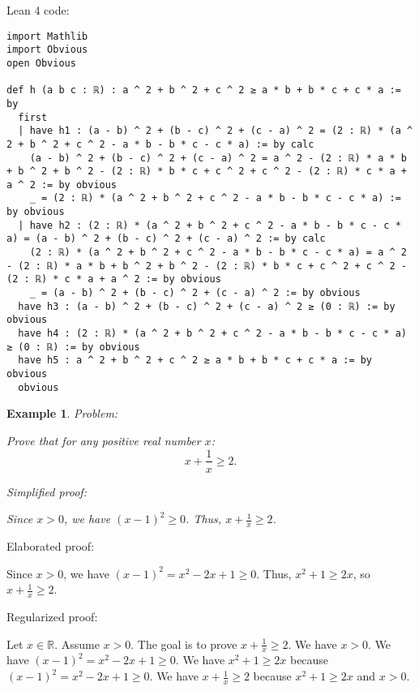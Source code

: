 \documentclass{article}
\newtheorem{example}{Example}
\begin{document}
Lean 4 code:
\begin{tcolorbox}[colback=white!10, width=\linewidth]
\begin{lstlisting}[language=Lean4]
import Mathlib
import Obvious
open Obvious

def h (a b c : ℝ) : a ^ 2 + b ^ 2 + c ^ 2 ≥ a * b + b * c + c * a := by
  first
  | have h1 : (a - b) ^ 2 + (b - c) ^ 2 + (c - a) ^ 2 = (2 : ℝ) * (a ^ 2 + b ^ 2 + c ^ 2 - a * b - b * c - c * a) := by calc
    (a - b) ^ 2 + (b - c) ^ 2 + (c - a) ^ 2 = a ^ 2 - (2 : ℝ) * a * b + b ^ 2 + b ^ 2 - (2 : ℝ) * b * c + c ^ 2 + c ^ 2 - (2 : ℝ) * c * a + a ^ 2 := by obvious
    _ = (2 : ℝ) * (a ^ 2 + b ^ 2 + c ^ 2 - a * b - b * c - c * a) := by obvious
  | have h2 : (2 : ℝ) * (a ^ 2 + b ^ 2 + c ^ 2 - a * b - b * c - c * a) = (a - b) ^ 2 + (b - c) ^ 2 + (c - a) ^ 2 := by calc
    (2 : ℝ) * (a ^ 2 + b ^ 2 + c ^ 2 - a * b - b * c - c * a) = a ^ 2 - (2 : ℝ) * a * b + b ^ 2 + b ^ 2 - (2 : ℝ) * b * c + c ^ 2 + c ^ 2 - (2 : ℝ) * c * a + a ^ 2 := by obvious
    _ = (a - b) ^ 2 + (b - c) ^ 2 + (c - a) ^ 2 := by obvious
  have h3 : (a - b) ^ 2 + (b - c) ^ 2 + (c - a) ^ 2 ≥ (0 : ℝ) := by obvious
  have h4 : (2 : ℝ) * (a ^ 2 + b ^ 2 + c ^ 2 - a * b - b * c - c * a) ≥ (0 : ℝ) := by obvious
  have h5 : a ^ 2 + b ^ 2 + c ^ 2 ≥ a * b + b * c + c * a := by obvious
  obvious

\end{lstlisting}
\end{tcolorbox}


\begin{example}
Problem:
\begin{tcolorbox}[colback=yellow!10, width=\linewidth]
Prove that for any positive real number $x$:
    $$x + \frac{1}{x} \geq 2.$$
\end{tcolorbox}

Simplified proof:
\begin{tcolorbox}[colback=blue!10, width=\linewidth]
Since $x>0$, we have $(x-1)^2 \ge 0$. Thus, $x + \frac{1}{x} \ge 2$.
\end{tcolorbox}
\end{example}

Elaborated proof:
\begin{tcolorbox}[colback=green!10, width=\linewidth]
Since $x>0$, we have $(x-1)^2 = x^2 - 2x + 1 \ge 0$. Thus, $x^2 + 1 \ge 2x$, so $x + \frac{1}{x} \ge 2$.
\end{tcolorbox}

Regularized proof:
\begin{tcolorbox}[colback=red!10, width=\linewidth]
Let $x\in\mathbb{R}$.
Assume $x>0$.
The goal is to prove $x + \frac{1}{x} \ge 2$.
We have $x>0$.
We have ${(x-1)}^2 = x^2 - 2x + 1 \ge 0$.
We have $x^2 + 1 \ge 2x$ because ${(x-1)}^2 = x^2 - 2x + 1 \ge 0$.
We have $x + \frac{1}{x} \ge 2$ because $x^2 + 1 \ge 2x$ and $x>0$.
\end{tcolorbox}
\end{document}
